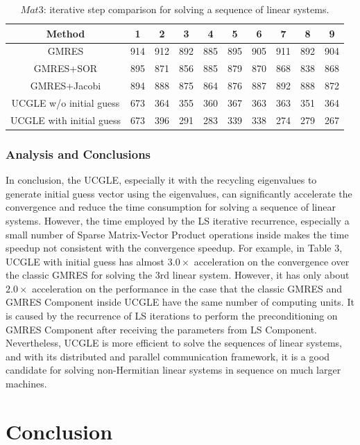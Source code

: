 \begin{table}[htbp]
	\small
	\label{tb2}
	\caption{$Mat3$: iterative step comparison for solving a sequence of linear systems.}
	\centering
	\renewcommand{\arraystretch}{1.6}
	\begin{tabular}{c*{9}{c}}
		\toprule
		Method              & 1 &  2 &  3 &  4 &  5  &  6  & 7 & 8 & 9\\
		\hline
		GMRES & 914 & 912 & 892 &885  & 895 & 905  &911&892& 904\\
		GMRES+SOR            & 895 & 871 & 856 & 885 & 879 & 870 &868&838&868\\
		GMRES+Jacobi            & 894 & 888 & 875 & 864 & 876 & 887 &892&888&872\\
		UCGLE w/o initial guess     & 673 & 364 & 355 & 360 & 367 &363 &363&351& 364\\
		UCGLE with initial guess     & 673 & 396 & 291 & 283 & 339 & 338  & 274 & 279 & 267\\
		\hline
	\end{tabular}
\end{table}

\subsubsection{Analysis and Conclusions}

In conclusion, the UCGLE, especially it with the recycling eigenvalues to generate initial guess vector using the eigenvalues, can significantly accelerate the convergence and reduce the time consumption for solving a sequence of linear systems. However, the time employed by the LS iterative recurrence, especially a small number of Sparse Matrix-Vector Product operations inside makes the time speedup not consistent with the convergence speedup. For example, in Table 3, UCGLE with initial guess has almost $3.0 \times$ acceleration on the convergence over the classic GMRES for solving the 3rd linear system. However, it has only about $2.0 \times$ acceleration on the performance in the case that the classic GMRES and GMRES Component inside UCGLE have the same number of computing units. It is caused by the recurrence of LS iterations to perform the preconditioning on GMRES Component after receiving the parameters from LS Component. Nevertheless, UCGLE is more efficient to solve the sequences of linear systems, and with its distributed and parallel communication framework, it is a good candidate for solving non-Hermitian linear systems in sequence on much larger machines.

\section{Conclusion}

\clearemptydoublepage